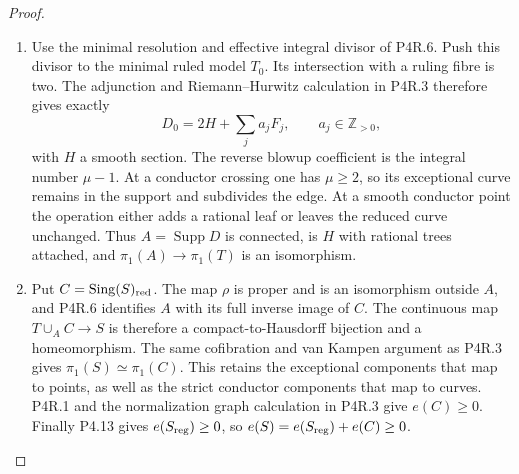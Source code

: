 \begin{proof}

\begin{enumerate}[label={$\langle1\rangle$\arabic*.},leftmargin=*]
\item Use the minimal resolution and effective
integral divisor of P4R.6. Push this
divisor to the minimal ruled model
$T_0$. Its intersection with a ruling
fibre is two. The adjunction and
Riemann--Hurwitz calculation in P4R.3
therefore gives exactly
\[
 D_0=2H+\sum_j a_jF_j,
 \qquad a_j\in\mathbb Z_{>0},
\]
with $H$ a smooth section. The reverse
blowup coefficient is the integral
number $\mu-1$. At a conductor crossing
one has $\mu\ge2$, so its exceptional
curve remains in the support and
subdivides the edge. At a smooth
conductor point the operation either
adds a rational leaf or leaves the
reduced curve unchanged. Thus
$A=\operatorname{Supp}D$ is connected,
is $H$ with rational trees attached,
and $\pi_1(A)\to\pi_1(T)$ is an
isomorphism.

\item Put $C=\operatorname{Sing}(S)_{\rm red}$.
The map $\rho$ is proper and is an
isomorphism outside $A$, and P4R.6
identifies $A$ with its full inverse
image of $C$. The continuous map
$T\cup_A C\to S$ is therefore a
compact-to-Hausdorff bijection and a
homeomorphism. The same cofibration
and van Kampen argument as P4R.3 gives
$\pi_1(S)\simeq\pi_1(C)$. This retains
the exceptional components that map
to points, as well as the strict
conductor components that map to
curves. P4R.1 and the normalization
graph calculation in P4R.3 give
$e(C)\ge0$. Finally P4.13 gives
$e(S_{\rm reg})\ge0$, so
$e(S)=e(S_{\rm reg})+e(C)\ge0$.

\end{enumerate}
\end{proof}
